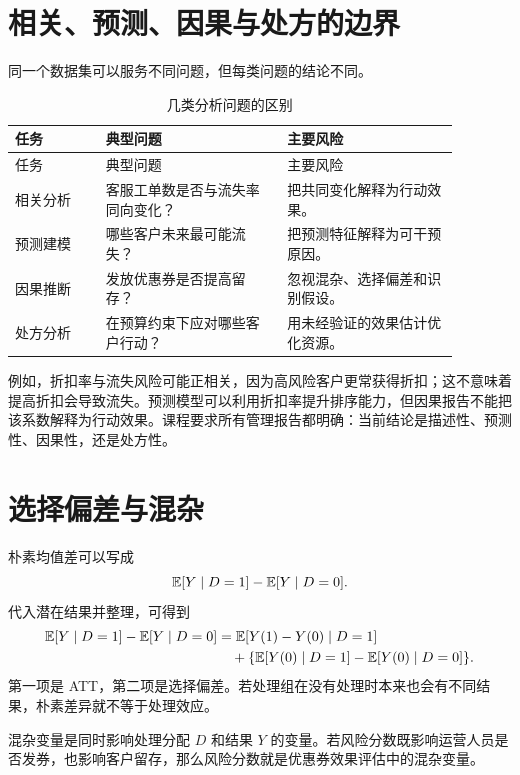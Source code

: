 \documentclass[UTF8,fontset=fandol,openany,zihao=-4]{ctexbook}
\begin{document}
\section{相关、预测、因果与处方的边界}

同一个数据集可以服务不同问题，但每类问题的结论不同。

\begin{longtable}{>{\raggedright\arraybackslash}p{0.18\linewidth}>{\raggedright\arraybackslash}p{0.36\linewidth}>{\raggedright\arraybackslash}p{0.34\linewidth}}
\caption{几类分析问题的区别}\\
\toprule
任务 & 典型问题 & 主要风险\\
\midrule
\endfirsthead
\toprule
任务 & 典型问题 & 主要风险\\
\midrule
\endhead
相关分析 & 客服工单数是否与流失率同向变化？ & 把共同变化解释为行动效果。\\
预测建模 & 哪些客户未来最可能流失？ & 把预测特征解释为可干预原因。\\
因果推断 & 发放优惠券是否提高留存？ & 忽视混杂、选择偏差和识别假设。\\
处方分析 & 在预算约束下应对哪些客户行动？ & 用未经验证的效果估计优化资源。\\
\bottomrule
\end{longtable}

例如，折扣率与流失风险可能正相关，因为高风险客户更常获得折扣；这不意味着提高折扣会导致流失。预测模型可以利用折扣率提升排序能力，但因果报告不能把该系数解释为行动效果。课程要求所有管理报告都明确：当前结论是描述性、预测性、因果性，还是处方性。

\section{选择偏差与混杂}

朴素均值差可以写成
\[
  \mathbb E[Y\mid D=1]-\mathbb E[Y\mid D=0].
\]
代入潜在结果并整理，可得到
\[
\begin{aligned}
  \mathbb E[Y\mid D=1]-\mathbb E[Y\mid D=0]
  &=
  \mathbb E[Y(1)-Y(0)\mid D=1] \\
  &\quad +
  \{\mathbb E[Y(0)\mid D=1]-\mathbb E[Y(0)\mid D=0]\}.
\end{aligned}
\]
第一项是 ATT，第二项是选择偏差。若处理组在没有处理时本来也会有不同结果，朴素差异就不等于处理效应。

\begin{definition}[混杂变量]
混杂变量是同时影响处理分配 \(D\) 和结果 \(Y\) 的变量。若风险分数既影响运营人员是否发券，也影响客户留存，那么风险分数就是优惠券效果评估中的混杂变量。
\end{definition}
\end{document}
